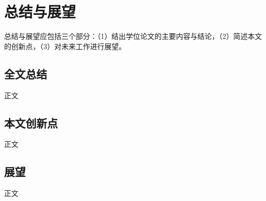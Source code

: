 \chapter{总结与展望}
总结与展望应包括三个部分：（1）结出学位论文的主要内容与结论，（2）简述本文的创新点，（3）对未来工作进行展望。
\section{全文总结}
正文

\section{本文创新点}
正文


\section{展望}
正文
